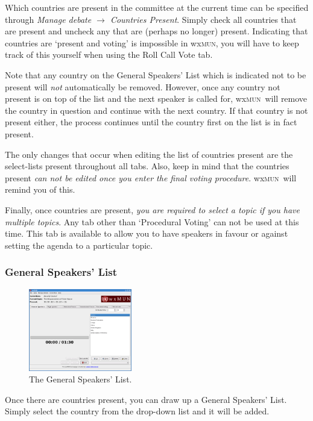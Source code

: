 \documentclass[11pt, a4paper]{article}
\newcommand\wxMUN{wx\textsc{mun}}
\begin{document}
Which countries are present in the committee at the current time can be specified through \emph{Manage debate $\rightarrow$ Countries Present}. Simply check all countries that are present and uncheck any that are (perhaps no longer) present. Indicating that countries are `present and voting' is impossible in \wxMUN , you will have to keep track of this yourself when using the Roll Call Vote tab.

Note that any country on the General Speakers' List which is indicated not to be present will \emph{not} automatically be removed. However, once any country not present is on top of the list and the next speaker is called for, \wxMUN\ will remove the country in question and continue with the next country. If that country is not present either, the process continues until the country first on the list is in fact present.

The only changes that occur when editing the list of countries present are the select-lists present throughout all tabs. Also, keep in mind that the countries present \emph{can not be edited once you enter the final voting procedure}. \wxMUN\ will remind you of this.

Finally, once countries are present, \emph{you are required to select a topic if you have multiple topics}. Any tab other than `Procedural Voting' can not be used at this time. This tab is available to allow you to have speakers in favour or against setting the agenda to a particular topic.

\subsubsection{General Speakers' List}
\begin{figure}
\includegraphics[width=0.40\textwidth]{screenshots/gsl.png}
\caption{The General Speakers' List.}
\end{figure}

Once there are countries present, you can draw up a General Speakers' List. Simply select the country from the drop-down list and it will be added. 
\end{document}
